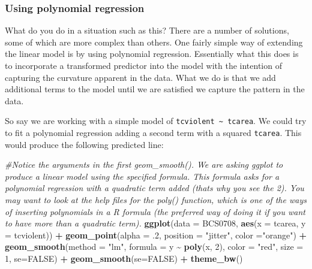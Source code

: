 \documentclass[
]{book}
\newenvironment{Shaded}{\begin{snugshade}}{\end{snugshade}}
\newcommand{\AttributeTok}[1]{\textcolor[rgb]{0.13,0.29,0.53}{#1}}
\newcommand{\CommentTok}[1]{\textcolor[rgb]{0.56,0.35,0.01}{\textit{#1}}}
\newcommand{\ConstantTok}[1]{\textcolor[rgb]{0.56,0.35,0.01}{#1}}
\newcommand{\DecValTok}[1]{\textcolor[rgb]{0.00,0.00,0.81}{#1}}
\newcommand{\FunctionTok}[1]{\textcolor[rgb]{0.13,0.29,0.53}{\textbf{#1}}}
\newcommand{\NormalTok}[1]{#1}
\newcommand{\SpecialCharTok}[1]{\textcolor[rgb]{0.81,0.36,0.00}{\textbf{#1}}}
\newcommand{\StringTok}[1]{\textcolor[rgb]{0.31,0.60,0.02}{#1}}
\begin{document}
\subsubsection{Using polynomial regression}\label{using-polynomial-regression}

What do you do in a situation such as this? There are a number of solutions, some of which are more complex than others. One fairly simple way of extending the linear model is by using polynomial regression. Essentially what this does is to incorporate a transformed predictor into the model with the intention of capturing the curvature apparent in the data. What we do is that we add additional terms to the model until we are satisfied we capture the pattern in the data.

So say we are working with a simple model of \texttt{tcviolent\ \textasciitilde{}\ tcarea}. We could try to fit a polynomial regression adding a second term with a squared \texttt{tcarea}. This would produce the following predicted line:

\begin{Shaded}
\begin{Highlighting}[]
\CommentTok{\#Notice the arguments in the first geom\_smooth(). We are asking ggplot to produce a linear model using the specified formula. This formula asks for a polynomial regression with a quadratic term added (that\textquotesingle{}s why you see the 2). You may want to look at the help files for the poly() function, which is one of the ways of inserting polynomials in a R formula (the preferred way of doing it if you want to have more than a quadratic term).}
\FunctionTok{ggplot}\NormalTok{(}\AttributeTok{data =}\NormalTok{ BCS0708, }\FunctionTok{aes}\NormalTok{(}\AttributeTok{x =}\NormalTok{ tcarea, }\AttributeTok{y =}\NormalTok{ tcviolent)) }\SpecialCharTok{+}
  \FunctionTok{geom\_point}\NormalTok{(}\AttributeTok{alpha =}\NormalTok{ .}\DecValTok{2}\NormalTok{, }\AttributeTok{position =} \StringTok{"jitter"}\NormalTok{, }\AttributeTok{color =}\StringTok{"orange"}\NormalTok{) }\SpecialCharTok{+}
  \FunctionTok{geom\_smooth}\NormalTok{(}\AttributeTok{method =} \StringTok{"lm"}\NormalTok{, }\AttributeTok{formula =}\NormalTok{ y }\SpecialCharTok{\textasciitilde{}} \FunctionTok{poly}\NormalTok{(x, }\DecValTok{2}\NormalTok{), }\AttributeTok{color =} \StringTok{"red"}\NormalTok{, }\AttributeTok{size =} \DecValTok{1}\NormalTok{, }\AttributeTok{se=}\ConstantTok{FALSE}\NormalTok{) }\SpecialCharTok{+}
  \FunctionTok{geom\_smooth}\NormalTok{(}\AttributeTok{se=}\ConstantTok{FALSE}\NormalTok{) }\SpecialCharTok{+}
  \FunctionTok{theme\_bw}\NormalTok{()}
\end{Highlighting}
\end{Shaded}
\end{document}
